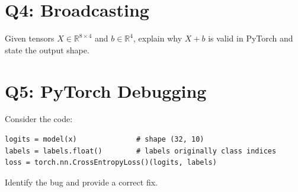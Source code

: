 \documentclass[11pt]{article}
\begin{document}
\section*{Q4: Broadcasting}
Given tensors $X\in\mathbb{R}^{8\times 4}$ and $b\in\mathbb{R}^{4}$, explain why $X+b$ is valid in PyTorch and state the output shape.

\section*{Q5: PyTorch Debugging}
Consider the code:
\begin{verbatim}
logits = model(x)              # shape (32, 10)
labels = labels.float()        # labels originally class indices
loss = torch.nn.CrossEntropyLoss()(logits, labels)
\end{verbatim}
Identify the bug and provide a correct fix.
\end{document}

